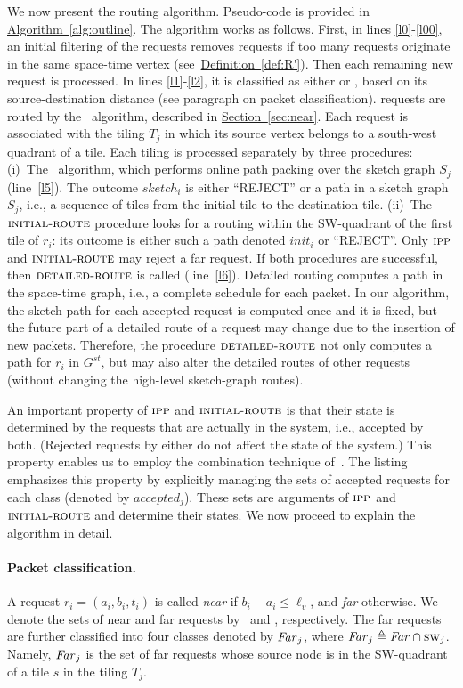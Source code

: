 \documentclass[11pt]{article}
\newcommand{\namedref}[2]{\hyperref[#2]{#1~\ref*{#2}}}
\newcommand{\sectionref}[1]{\namedref{Section}{#1}}
\newcommand{\defref}[1]{\namedref{Definition}{#1}}
\newcommand{\Algref}[1]{\namedref{Algorithm}{#1}}
\newcommand{\route}{\text{\sc{ipp}}\xspace}
\newcommand{\IPP}{\route}
\newcommand{\routenear}{\text{\sc{route-near}}\xspace}
\newcommand{\initroute}{\text{\sc{initial-route}}\xspace}
\newcommand{\detailedroute}{\text{\sc{detailed-route}}}
\newenvironment{proof sketch}[1]{\noindent {\emph{Proof sketch of #1:}}}{\hfill \qed}
\def\DEF{\triangleq}
\newcommand{\far}{\text{\emph{Far}}\xspace}
\newcommand{\sw}{\text{\sc{sw}\xspace}\xspace}
\newcommand{\near}{\text{\emph{Near}}\xspace}
\newcommand{\vl}{\ell_v}
\begin{document}
We now present the routing algorithm. Pseudo-code is provided in
\Algref{alg:outline}.  The algorithm works as follows. First, in lines
\ref{l0}-\ref{l00}, an initial filtering of the requests removes requests if too many
requests originate in the same space-time vertex (see~\defref{def:R'}). Then each
remaining new request is processed. In lines \ref{l1}-\ref{l2}, it is classified as
either \near or \far, based on its source-destination distance (see paragraph on
packet classification).  \near requests are routed by the \routenear\ algorithm,
described in \sectionref{sec:near}.
Each \far request is associated with the tiling
$T_j$ in which its source vertex belongs to a south-west quadrant of a tile. Each
tiling is processed separately by three procedures: (i)~The \IPP\ algorithm, which
performs online path packing over the sketch graph $S_j$ (line~\ref{l5}). The outcome
$sketch_i$ is either ``REJECT'' or a path in a sketch graph $S_j$, i.e., a sequence
of tiles from the initial tile to the destination tile.  (ii)~The $\initroute$
procedure looks for a routing within the SW-quadrant of the first tile of $r_i$: its
outcome is either such a path denoted $init_i$ or ``REJECT''. Only $\IPP$ and
$\initroute$ may reject a far request. If both procedures are
successful, then $\detailedroute$ is called (line~\ref{l6}). Detailed routing computes a path in
the space-time graph, i.e., a complete schedule for each packet.  In our algorithm,
the sketch path for each accepted request is computed once and it is fixed, but
the future part of a detailed route of a request may change due to the insertion of new packets.
Therefore, the procedure $\detailedroute$ not only computes a path for $r_i$ in
$G^{st}$, but may also alter the detailed routes of other requests (without changing
the high-level sketch-graph routes).

An important property of $\IPP$ and $\initroute$ is that their state
is determined by the requests that are actually in the system, i.e.,
accepted by both.  (Rejected requests by either do not affect the
state of the system.)  This property enables us to employ the
combination technique of~\cite{KT}.  The listing emphasizes this
property by explicitly managing the sets of accepted requests for
each class (denoted by $accepted_j$). These sets are arguments of
$\IPP$ and $\initroute$ and determine their states. We now proceed to
explain the algorithm in detail.


\paragraph{Packet classification\ifnum{}.\fi}
A request $r_i=(a_i,b_i,t_i)$ is called \emph{near} if $b_i-a_i \leq \vl$, and
\emph{far} otherwise. We denote the sets of near and far requests by \near\ and \far,
respectively. The far requests are further classified into four classes denoted by
$\far_j$, where $\far_j\DEF \far \cap \sw_j$. Namely, $\far_j$ is the set of far
requests whose source node is in the SW-quadrant of a tile $s$ in the tiling $T_j$.
\end{document}

